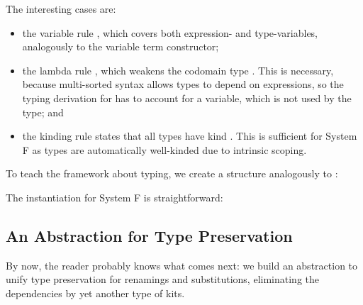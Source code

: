 \documentclass[a4paper, UKenglish, cleveref, autoref, thm-restate]{lipics-v2021}
\newenvironment{LibCode*}{%
  \begin{tcolorbox}[%
    colframe=white,%
    boxrule=0.0pt,%
    top=2.5pt,%
    left=2.5pt,%
    bottom=2.5pt,%
    right=2.5pt,%
    before skip=5pt,%
    after skip=5pt,%
    boxsep=0pt%
  ]
}{%
  \end{tcolorbox}%
}
\newcommand*\LibCode[1]{\begin{LibCode*}{#1}\end{LibCode*}}
\newcommand*\AppCode[1]{{#1}}
\newcommand*\ACode[1]{\AgdaFontStyle{\textcolor{mygray}{#1}}}
\newcommand*\ACon[1]{\AgdaInductiveConstructor{#1}}
\begin{document}

  The interesting cases are:
  \begin{itemize}
  \item
    the variable rule \ACode{\ACon{⊢`}}, which covers both expression- and
    type-variables, analogously to the variable term constructor;
  \item
    the lambda rule \ACode{\ACon{⊢λ}}, which
    weakens the codomain type \ACode{t₂}.
    This is necessary, because multi-sorted syntax allows types
    to depend on expressions, so the typing derivation for \ACode{e}
    has to account for a variable, which is not used by the type; and
  \item
    the kinding rule \ACode{\ACon{⊢τ}} states that all types
    have kind \ACode{\ACon{★}}. This is sufficient for System F as types
    are automatically well-kinded due to intrinsic scoping.
  \end{itemize}
  To teach the framework about typing, we create a structure analogously to
  \ACode{\ACon{Syntax}}:
  \LibCode\KTyping
  The instantiation for System F is straightforward:
  \AppCode\FTypingInst

  \subsection{An Abstraction for Type Preservation}
  By now, the reader probably knows what comes next: we build an
  abstraction to unify type preservation for renamings and substitutions,
  eliminating the dependencies by yet another type of kits.
\end{document}
